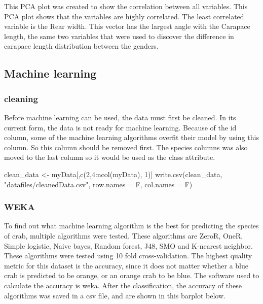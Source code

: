 \documentclass[
]{article}
\newenvironment{Shaded}{}{}
\newcommand{\AttributeTok}[1]{#1}
\newcommand{\DecValTok}[1]{#1}
\newcommand{\FunctionTok}[1]{#1}
\newcommand{\NormalTok}[1]{#1}
\newcommand{\OtherTok}[1]{\textcolor[rgb]{1.00,0.25,0.00}{#1}}
\newcommand{\SpecialCharTok}[1]{\textcolor[rgb]{0.00,0.50,0.50}{#1}}
\newcommand{\StringTok}[1]{\textcolor[rgb]{0.00,0.50,0.50}{#1}}
\begin{document}
This PCA plot was created to show the correlation between all variables.
This PCA plot shows that the variables are highly correlated. The least
correlated variable is the Rear width. This vector has the largest angle
with the Carapace length, the same two variables that were used to
discover the difference in carapace length distribution between the
genders.

\newpage

\hypertarget{machine-learning}{%
\subsection{Machine learning}\label{machine-learning}}

\hypertarget{cleaning}{%
\subsubsection{cleaning}\label{cleaning}}

Before machine learning can be used, the data must first be cleaned. In
its current form, the data is not ready for machine learning. Because of
the id column, some of the machine learning algorithms overfit their
model by using this column. So this column should be removed first. The
species columns was also moved to the last column so it would be used as
the class attribute.

\begin{Shaded}
\begin{Highlighting}[]
\NormalTok{clean\_data }\OtherTok{\textless{}{-}}\NormalTok{ myData[,}\FunctionTok{c}\NormalTok{(}\DecValTok{2}\NormalTok{,}\DecValTok{4}\SpecialCharTok{:}\FunctionTok{ncol}\NormalTok{(myData), }\DecValTok{1}\NormalTok{)]}
\FunctionTok{write.csv}\NormalTok{(clean\_data, }\StringTok{"datafiles/cleanedData.csv"}\NormalTok{, }\AttributeTok{row.names =}\NormalTok{ F, }\AttributeTok{col.names =}\NormalTok{ F)}
\end{Highlighting}
\end{Shaded}

\hypertarget{weka}{%
\subsubsection{WEKA}\label{weka}}

To find out what machine learning algorithm is the best for predicting
the species of crab, multiple algorithms were tested. These algorithms
are ZeroR, OneR, Simple logistic, Naive bayes, Random forest, J48, SMO
and K-nearest neighbor. These algorithms were tested using 10 fold
cross-validation. The highest quality metric for this dataset is the
accuracy, since it does not matter whether a blue crab is predicted to
be orange, or an orange crab to be blue. The software used to calculate
the accuracy is weka. After the classification, the accuracy of these
algorithms was saved in a csv file, and are shown in this barplot below.
\end{document}
